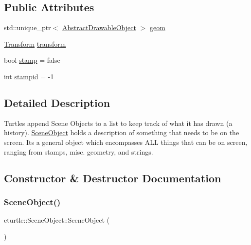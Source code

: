 \subsection*{Public Attributes}
\begin{DoxyCompactItemize}
\item 
std\+::unique\+\_\+ptr$<$ \hyperlink{classcturtle_1_1AbstractDrawableObject}{Abstract\+Drawable\+Object} $>$ \hyperlink{structcturtle_1_1SceneObject_a1db44363183fd197b232d5f6e4b89b5c}{geom}
\item 
\hyperlink{classcturtle_1_1Transform}{Transform} \hyperlink{structcturtle_1_1SceneObject_a427fb0ab63fa9e0dd5c7b5c15ac3f6f4}{transform}
\item 
bool \hyperlink{structcturtle_1_1SceneObject_a014644aee0792d77bd84a0b98464f39b}{stamp} = false
\item 
int \hyperlink{structcturtle_1_1SceneObject_ae6094918613e5d4d284805cd5afb2e65}{stampid} = -\/1
\end{DoxyCompactItemize}


\subsection{Detailed Description}
Turtles append Scene Objects to a list to keep track of what it has drawn (a history). \hyperlink{structcturtle_1_1SceneObject}{Scene\+Object} holds a description of something that needs to be on the screen. It\textquotesingle{}s a general object which encompasses A\+LL things that can be on screen, ranging from stamps, misc. geometry, and strings. 

\subsection{Constructor \& Destructor Documentation}
\mbox{\label{structcturtle_1_1SceneObject_ac51b04f4e0509e37a7acce739e608e49}} 
\subsubsection{\texorpdfstring{Scene\+Object()}{SceneObject()}\hspace{0.1cm}{\footnotesize\ttfamily [1/2]}}
{\footnotesize\ttfamily cturtle\+::\+Scene\+Object\+::\+Scene\+Object (\begin{DoxyParamCaption}{ }\end{DoxyParamCaption})\hspace{0.3cm}{\ttfamily [inline]}}


